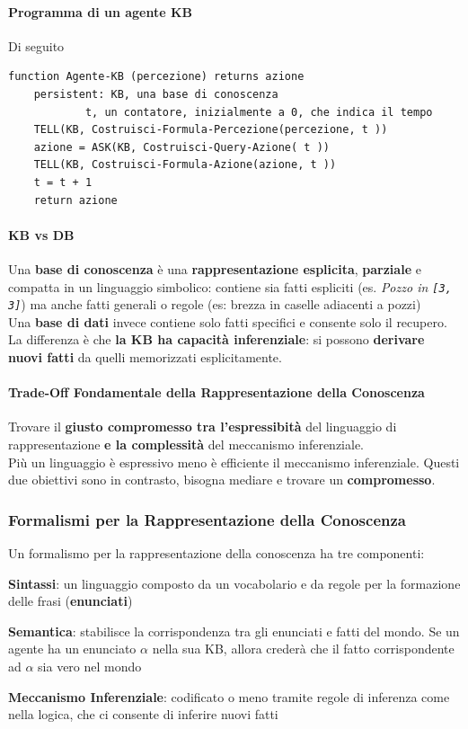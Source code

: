 \documentclass[10pt]{book}
\begin{document}
\paragraph{Programma di un agente KB} Di seguito
\begin{lstlisting}
function Agente-KB (percezione) returns azione
	persistent:	KB, una base di conoscenza
			t, un contatore, inizialmente a 0, che indica il tempo
	TELL(KB, Costruisci-Formula-Percezione(percezione, t ))
	azione = ASK(KB, Costruisci-Query-Azione( t ))
	TELL(KB, Costruisci-Formula-Azione(azione, t ))
	t = t + 1
	return azione
\end{lstlisting}
\paragraph{KB vs DB} Una \textbf{base di conoscenza} è una \textbf{rappresentazione esplicita}, \textbf{parziale} e compatta in un linguaggio simbolico: contiene sia fatti espliciti (es. \textit{Pozzo in \texttt{[3, 3]}}) ma anche fatti generali o regole (es: brezza in caselle adiacenti a pozzi)\\
Una \textbf{base di dati} invece contiene solo fatti specifici e consente solo il recupero.\\
La differenza è che \textbf{la KB ha capacità inferenziale}: si possono \textbf{derivare nuovi fatti} da quelli memorizzati esplicitamente.
\paragraph{Trade-Off Fondamentale della Rappresentazione della Conoscenza} Trovare il \textbf{giusto compromesso tra l'espressibità} del linguaggio di rappresentazione \textbf{e la complessità} del meccanismo inferenziale.\\
Più un linguaggio è espressivo meno è efficiente il meccanismo inferenziale. Questi due obiettivi sono in contrasto, bisogna mediare e trovare un \textbf{compromesso}.\\
\subsubsection{Formalismi per la Rappresentazione della Conoscenza} Un formalismo per la rappresentazione della conoscenza ha tre componenti:
\begin{list}{}{}
	\item \textbf{Sintassi}: un linguaggio composto da un vocabolario e da regole per la formazione delle frasi (\textbf{enunciati})
	\item \textbf{Semantica}: stabilisce la corrispondenza tra gli enunciati e fatti del mondo. Se un agente ha un enunciato $\alpha$ nella sua KB, allora crederà che il fatto corrispondente ad $\alpha$ sia vero nel mondo
	\item \textbf{Meccanismo Inferenziale}: codificato o meno tramite regole di inferenza come nella logica, che ci consente di inferire nuovi fatti
\end{list}
\end{document}
